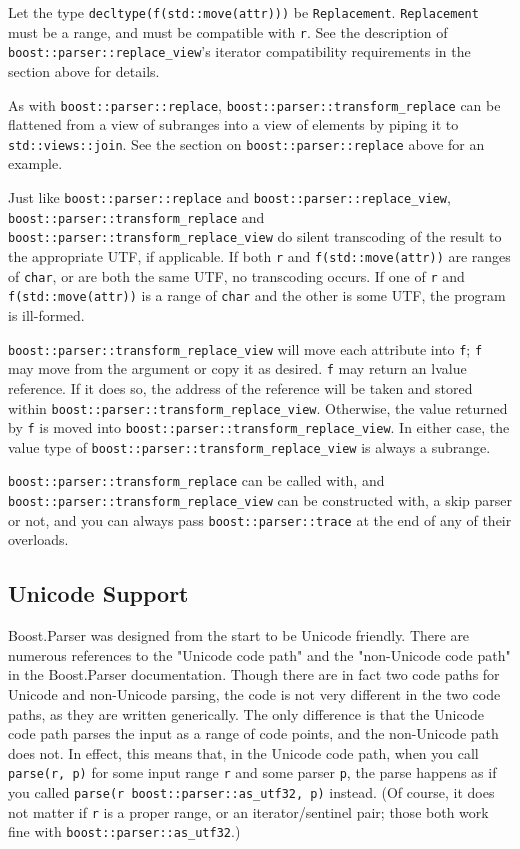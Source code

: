 Let the type \texttt{decltype(f(std::move(attr)))} be \texttt{Replacement}. \texttt{Replacement} must be a range, and must be compatible with \texttt{r}. See the description of \texttt{boost::parser::replace\_view}'s iterator compatibility requirements in the section above for details.

As with \texttt{boost::parser::replace}, \texttt{boost::parser::transform\_replace} can be flattened from a view of subranges into a view of elements by piping it to \texttt{std::views::join}. See the section on \texttt{boost::parser::replace} above for an example.

Just like \texttt{boost::parser::replace} and \texttt{boost::parser::replace\_view}, \texttt{boost::parser::transform\_replace} and \texttt{boost::parser::transform\_replace\_view} do silent transcoding of the result to the appropriate UTF, if applicable. If both \texttt{r} and \texttt{f(std::move(attr))} are ranges of \texttt{char}, or are both the same UTF, no transcoding occurs. If one of \texttt{r} and \texttt{f(std::move(attr))} is a range of \texttt{char} and the other is some UTF, the program is ill-formed.

\texttt{boost::parser::transform\_replace\_view} will move each attribute into \texttt{f}; \texttt{f} may move from the argument or copy it as desired. \texttt{f} may return an lvalue reference. If it does so, the address of the reference will be taken and stored within \texttt{boost::parser::transform\_replace\_view}. Otherwise, the value returned by \texttt{f} is moved into \texttt{boost::parser::transform\_replace\_view}. In either case, the value type of \texttt{boost::parser::transform\_replace\_view} is always a subrange.

\texttt{boost::parser::transform\_replace} can be called with, and \texttt{boost::parser::transform\_replace\_view} can be constructed with, a skip parser or not, and you can always pass \texttt{boost::parser::trace} at the end of any of their overloads.

\subsection{Unicode Support}

Boost.Parser was designed from the start to be Unicode friendly. There are numerous references to the "Unicode code path" and the "non-Unicode code path" in the Boost.Parser documentation. Though there are in fact two code paths for Unicode and non-Unicode parsing, the code is not very different in the two code paths, as they are written generically. The only difference is that the Unicode code path parses the input as a range of code points, and the non-Unicode path does not. In effect, this means that, in the Unicode code path, when you call \texttt{parse(r, p)} for some input range \texttt{r} and some parser \texttt{p}, the parse happens as if you called \texttt{parse(r \textbar{} boost::parser::as\_utf32, p)} instead. (Of course, it does not matter if \texttt{r} is a proper range, or an iterator/sentinel pair; those both work fine with \texttt{boost::parser::as\_utf32}.)

